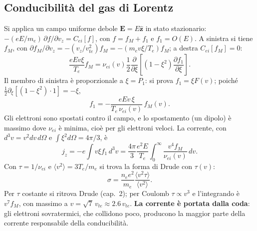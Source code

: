 \subsection{Conducibilità del gas di Lorentz}
Si applica un campo uniforme debole $\mathbf{E}=E\hat{\mathbf{z}}$ in stato stazionario: $-(eE/m_e)\,\partial f/\partial v_z=C_{ei}[f]$, con $f=f_M+f_1$ e $f_1=O(E)$. A sinistra si tiene $f_M$, con $\partial f_M/\partial v_z=-(v_z/v_{te}^2)f_M=-(m_ev\xi/T_e)f_M$; a destra $C_{ei}[f_M]=0$:
\begin{equation}
\frac{eEv\xi}{T_e}f_M=\nu_{ei}(v)\frac12\frac{\partial}{\partial\xi}\left[(1-\xi^2)\frac{\partial f_1}{\partial\xi}\right].
\end{equation}
Il membro di sinistra è proporzionale a $\xi=P_1$: si prova $f_1=\xi F(v)$; poiché $\frac12\partial_\xi[(1-\xi^2)\cdot1]=-\xi$,
\begin{equation}
f_1=-\frac{eEv\,\xi}{T_e\,\nu_{ei}(v)}\,f_M(v).
\end{equation}
Gli elettroni sono spostati contro il campo, e lo spostamento (un dipolo) è massimo dove $\nu_{ei}$ è minima, cioè per gli elettroni veloci. La corrente, con $d^3v=v^2dv\,d\Omega$ e $\int\xi^2d\Omega=4\pi/3$, è
\begin{equation}
j_z=-e\int v\xi f_1\,d^3v=\frac{4\pi}{3}\frac{e^2E}{T_e}\int_0^\infty\frac{v^4f_M}{\nu_{ei}(v)}\,dv .
\end{equation}
Con $\tau=1/\nu_{ei}$ e $\langle v^2\rangle=3T_e/m_e$ si trova la forma di Drude con $\tau(v)$:
\begin{equation}
\sigma=\frac{n_ee^2}{m_e}\frac{\langle v^2\tau\rangle}{\langle v^2\rangle}.
\end{equation}
Per $\tau$ costante si ritrova Drude (cap.~2); per Coulomb $\tau\propto v^3$ e l'integrando è $v^7f_M$, con massimo a $v=\sqrt7\,v_{te}\approx2.6\,v_{te}$. \textbf{La corrente è portata dalla coda}: gli elettroni sovratermici, che collidono poco, producono la maggior parte della corrente responsabile della conducibilità.

